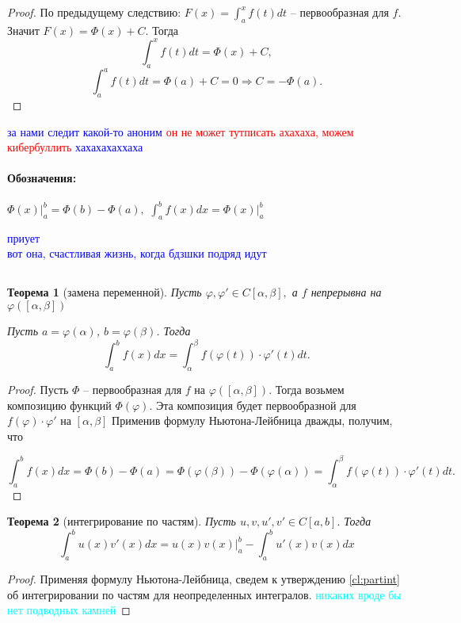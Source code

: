 \documentclass{article}
\theoremstyle{plain}
\newtheorem{theorem}{Теорема}
\theoremstyle{definition}
\theoremstyle{remark}
\renewcommand{\*}{\cdot}
\begin{document}
\begin{proof}
По предыдущему следствию: $F(x) = \int_a^x f(t)dt$ -- первообразная для $f$.
Значит $F(x) = \Phi(x) + C.$ Тогда
$$\int_a^x f(t)dt =\Phi(x) +C,$$
$$\int_a^a f(t)dt =\Phi(a) +C = 0 \Rightarrow C =-\Phi(a).$$
\end{proof}

\textcolor{blue}{за нами следит какой-то аноним}
\textcolor{red}{он не может тутписать ахахаха, можем кибербуллить}
\textcolor{blue}{хахахахаххаха}
\paragraph{Обозначения:} $\displaystyle\Phi(x) \Big|_a^b = \Phi(b) - \Phi(a),$ $\displaystyle\int_a^b f(x)dx = \Phi(x) \Big|_a^b$


\textcolor{blue}{приует\\
вот она, счастливая жизнь, когда бдзшки подряд идут}

\subsection{}
\begin{theorem}[замена переменной]\label{th:varreplace}
Пусть $\varphi, \varphi' \in C[\alpha, \beta],$ а $f$ непрерывна на $\varphi([\alpha,\beta])$ 
 
Пусть $a=\varphi(\alpha)$, $b = \varphi(\beta)$. Тогда
$$\int_a^bf(x)dx = \int_{\alpha}^{\beta}f(\varphi(t))\cdot \varphi'(t)dt.$$
\end{theorem}
\begin{proof}
Пусть $\Phi$  -- первообразная для $f$ на $\varphi([\alpha,\beta]).$ Тогда возьмем композицию 
функций $\Phi(\varphi)$.
Эта композиция будет первообразной для $f(\varphi) \cdot \varphi'$ на $[\alpha,\beta]$ Применив формулу Ньютона-Лейбница дважды, получим, что 

$$\int_a^bf(x)dx = \Phi(b) - \Phi(a) = \Phi(\varphi(\beta)) - \Phi(\varphi(\alpha)) = \int_{\alpha}^{\beta}f(\varphi(t))\cdot \varphi'(t)dt.$$


\end{proof}


\begin{theorem} [интегрирование по частям]
Пусть $u, v, u', v' \in C[a, b].$ Тогда \begin{equation}\label{eq:partint}
\int_a^b u(x)v'(x)dx = u(x)v(x) \Big|_a^b - \int_a^b u'(x)v(x)dx
\end{equation}
\end{theorem}
\begin{proof}
Применяя формулу Ньютона-Лейбница, сведем к утверждению \ref{cl:partint} об интегрировании по частям для неопределенных интегралов.
\textcolor{cyan}{никаких вроде бы нет подводных камней}
\end{proof}
\end{document}
